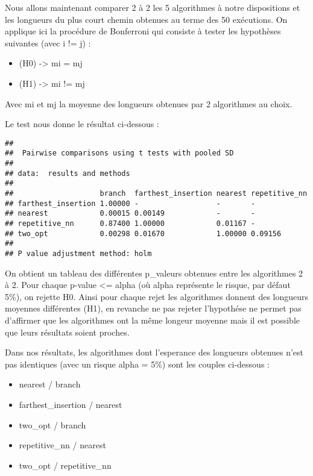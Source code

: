 \documentclass[
]{article}
\providecommand{\tightlist}{%
  \setlength{\itemsep}{0pt}\setlength{\parskip}{0pt}}
\begin{document}
Nous allons maintenant comparer 2 à 2 les 5 algorithmes à notre
dispositions et les longueurs du plus court chemin obtenues au terme des
50 exécutions. On applique ici la procédure de Bonferroni qui consiste à
tester les hypothèses suivantes (avec i != j) :

\begin{itemize}
\tightlist
\item
  (H0) -\textgreater{} mi = mj
\item
  (H1) -\textgreater{} mi != mj
\end{itemize}

Avec mi et mj la moyenne des longueurs obtenues par 2 algorithmes au
choix.

Le test nous donne le résultat ci-dessous :

\begin{verbatim}
## 
##  Pairwise comparisons using t tests with pooled SD 
## 
## data:  results and methods 
## 
##                    branch  farthest_insertion nearest repetitive_nn
## farthest_insertion 1.00000 -                  -       -            
## nearest            0.00015 0.00149            -       -            
## repetitive_nn      0.87400 1.00000            0.01167 -            
## two_opt            0.00298 0.01670            1.00000 0.09156      
## 
## P value adjustment method: holm
\end{verbatim}

On obtient un tableau des différentes p\_valeurs obtenues entre les
algorithmes 2 à 2. Pour chaque p-value \textless= alpha (où alpha
représente le risque, par défaut 5\%), on rejette H0. Ainsi pour chaque
rejet les algorithmes donnent des longueurs moyennes différentes (H1),
en revanche ne pas rejeter l'hypothése ne permet pas d'affirmer que les
algorithmes ont la même longeur moyenne mais il est possible que leurs
résultats soient proches.

Dans nos résultats, les algorithmes dont l'esperance des longueurs
obtenues n'est pas identiques (avec un risque alpha = 5\%) sont les
couples ci-dessous :

\begin{itemize}
\tightlist
\item
  nearest / branch
\item
  farthest\_insertion / nearest
\item
  two\_opt / branch
\item
  repetitive\_nn / nearest
\item
  two\_opt / repetitive\_nn
\end{itemize}
\end{document}
